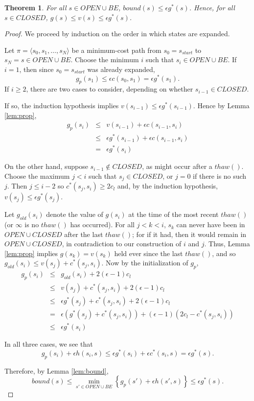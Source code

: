 \documentclass[letterpaper]{article}
\newtheorem{thm}{Theorem}
\begin{document}
\begin{thm}
\label{thm:subopt}
For all $s\in OPEN\cup BE$, $bound(s) \le \epsilon g^*(s)$. Hence, for all $s\in CLOSED$, $g(s) \le v(s) \le \epsilon g^*(s)$.
\end{thm}

\begin{proof}
We proceed by induction on the order in which states are expanded.

Let $\pi = \langle s_0,s_1,\ldots,s_N \rangle$ be a minimum-cost path from $s_0 = s_{start}$ to $s_N = s\in OPEN\cup BE$. Choose the minimum $i$ such that $s_i\in OPEN\cup BE$. If $i = 1$, then since $s_0 = s_{start}$ was already expanded,
\[g_p(s_1) \le \epsilon c(s_0,s_1) = \epsilon g^*(s_1).\]
If $i \ge 2$, there are two cases to consider, depending on whether $s_{i-1}\in CLOSED$.

If so, the induction hypothesis implies $v(s_{i-1}) \le \epsilon g^*(s_{i-1})$. Hence by Lemma \ref{lem:prop},
\begin{eqnarray*}
g_p(s_i) &\le& v(s_{i-1}) + \epsilon c(s_{i-1},s_i)
\\&\le& \epsilon g^*(s_{i-1}) + \epsilon c(s_{i-1},s_i)
\\&=& \epsilon g^*(s_i)
\end{eqnarray*}

On the other hand, suppose $s_{i-1}\notin CLOSED$, as might occur after a $thaw()$. Choose the maximum $j<i$ such that $s_j\in CLOSED$, or $j=0$ if there is no such $j$. Then $j\le i-2$ so $c^*(s_j,s_i)\ge 2c_l$ and, by the induction hypothesis, $v(s_j)\le \epsilon g^*(s_j)$.

Let $g_{old}(s_i)$ denote the value of $g(s_i)$ at the time of the most recent $thaw()$ (or $\infty$ is no $thaw()$ has occurred). For all $j < k < i$, $s_k$ can never have been in $OPEN\cup CLOSED$ after the last $thaw()$; for if it had, then it would remain in $OPEN\cup CLOSED$, in contradiction to our construction of $i$ and $j$. Thus, Lemma \ref{lem:prop} implies $g(s_k) = v(s_k)$ held ever since the last $thaw()$, and so $g_{old}(s_i) \le v(s_j) + c^*(s_j,s_i)$. Now by the initialization of $g_p$,
\begin{eqnarray*}
g_p(s_i) &\le& g_{old}(s_i) + 2(\epsilon-1)c_l
\\&\le& v(s_j) + c^*(s_j,s_i) + 2(\epsilon-1)c_l
\\&\le& \epsilon g^*(s_j) + c^*(s_j,s_i) + 2(\epsilon-1)c_l
\\&=& \epsilon (g^*(s_j) + c^*(s_j,s_i)) + (\epsilon-1)(2c_l - c^*(s_j,s_i))
\\&\le& \epsilon g^*(s_i)
\end{eqnarray*}

In all three cases, we see that
\[g_p(s_i) + \epsilon h(s_i,s) \le \epsilon g^*(s_i) + \epsilon c^*(s_i,s) = \epsilon g^*(s).\]

Therefore, by Lemma \ref{lem:bound},
\[bound(s) \le \min_{s' \in OPEN \cup BE} \left\{g_p(s') + \epsilon h(s',s)\right\} \le \epsilon g^*(s).\]
\end{proof}
\end{document}
